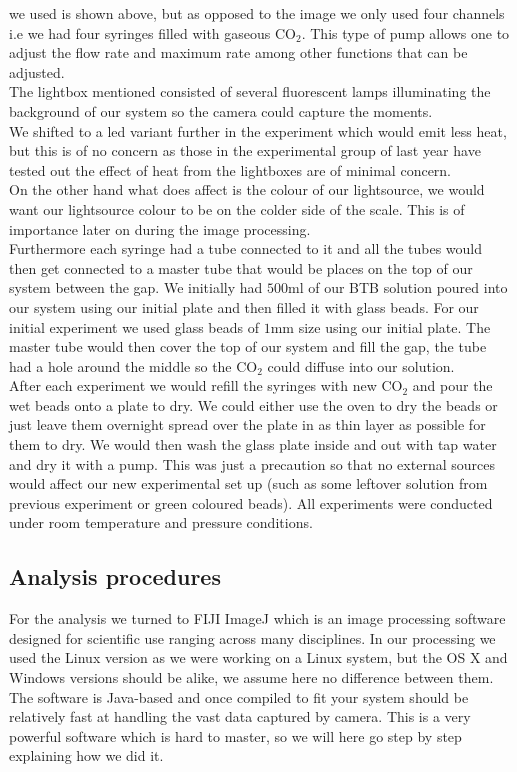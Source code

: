 \documentclass[twoside]{article}
\begin{document}
\begin{multicols}{2}
we used is shown above, but as opposed to the image we only used four channels i.e we had four syringes filled with gaseous CO$_2$. This type of pump allows one to adjust the flow rate and maximum rate among other functions that can be adjusted. \\
The lightbox mentioned consisted of several fluorescent lamps illuminating the background of our system so the camera could capture the moments. \\
We shifted to a led variant further in the experiment which would emit less heat, but this is of no concern as those in the experimental group of last year have tested out the effect of heat from the lightboxes are of minimal concern.\\ 
On the other hand what does affect is the colour of our lightsource, we would want our lightsource colour to be on the colder side of the scale. This is of importance later on during the image processing.\\
Furthermore each syringe had a tube connected to it and all the tubes would then get connected to a master tube that would be places on the top of our system between the gap. We initially had $500$ml of our BTB solution poured into our system using our initial plate and then filled it with glass beads. For our initial experiment we used glass beads of $1$mm size using our initial plate. The master tube would then cover the top of our system and fill the gap, the tube had a hole around the middle so the CO$_2$ could diffuse into our solution. \\ 
After each experiment we would refill the syringes with new CO$_2$ and pour the wet beads onto a plate to dry. We could either use the oven to dry the beads or just leave them overnight spread over the plate in as thin layer as possible for them to dry. We would then wash the glass plate inside and out with tap water and dry it with a pump. This was just a precaution so that no external sources would affect our new experimental set up (such as some leftover solution from previous experiment or green coloured beads). All experiments were conducted under room temperature and pressure conditions.\\

\subsection{Analysis procedures} \label{analysis}
For the analysis we turned to FIJI ImageJ\cite{imagej} which is an image processing software designed for scientific use ranging across many disciplines. In our processing we used the Linux version as we were working on a Linux system, but the OS X and Windows versions should be alike, we assume here no difference between them. The software is Java-based and once compiled to fit your system should be relatively fast at handling the vast data captured by camera. This is a very powerful software which is hard to master, so we will here go step by step explaining how we did it.\\


\end{multicols}
\end{document}
